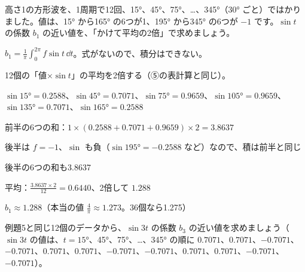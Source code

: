 \begin{reidai}[12個のデータから係数を求める]
高さ1の方形波を、1周期で12回、15°、45°、75°、…、345°（30° ごと）ではかりました。値は、15° から165° の6つが1、195° から345° の6つが $-1$ です。$\sin t$ の係数 $b_1$ の近い値を、「かけて平均の2倍」で求めましょう。\par
\kangaekata {}\par
{}\enspace $b_1=\frac{1}{\pi}\int_0^{2\pi}f\sin t\,\dd t$。式がないので、積分はできない。\par
{}\enspace 12個の「値×$\sin t$」の平均を2倍する（⑤の表計算と同じ）。\par
\shiki\kixbs $\sin15°=0.2588$、$\sin45°=0.7071$、$\sin75°=0.9659$、$\sin105°=0.9659$、$\sin135°=0.7071$、$\sin165°=0.2588$\par
\kixba 前半の6つの和：$1\times(0.2588+0.7071+0.9659)\times2=3.8637$\par
\kixba 後半は $f=-1$、$\sin$ も負（$\sin195°=-0.2588$ など）なので、積は前半と同じ\par
\kixbb 後半の6つの和も3.8637\par
\kixba 平均：$\frac{3.8637\times2}{12}=0.6440$、2倍して $1.288$\par
\kotae $b_1\approx1.288$（本当の値 $\frac{4}{\pi}\approx1.273$。36個なら1.275）
\end{reidai}

\begin{jibun}
例題5と同じ12個のデータから、$\sin3t$ の係数 $b_3$ の近い値を求めましょう（$\sin3t$ の値は、$t=15°$、45°、75°、…、345° の順に $0.7071$、$0.7071$、$-0.7071$、$-0.7071$、$0.7071$、$0.7071$、$-0.7071$、$-0.7071$、$0.7071$、$0.7071$、$-0.7071$、$-0.7071$）。
\end{jibun}

